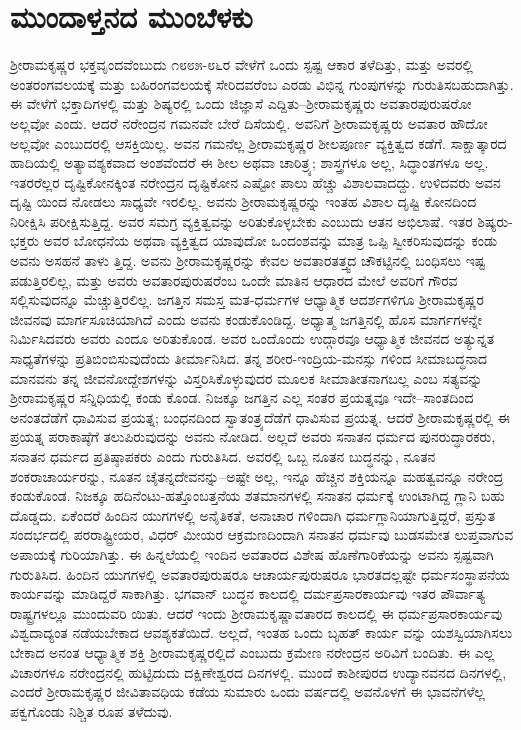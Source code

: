
\chapter{ಮುಂದಾಳ್ತನದ ಮುಂಬೆಳಕು}

\noindent

ಶ್ರೀರಾಮಕೃಷ್ಣರ ಭಕ್ತವೃಂದವೆಂಬುದು ೧೮೮೫-೮೬ರ ವೇಳೆಗೆ ಒಂದು ಸ್ಪಷ್ಟ ಆಕಾರ ತಳೆದಿತ್ತು, ಮತ್ತು ಅವರಲ್ಲಿ ಅಂತರಂಗವಲಯಕ್ಕೆ ಮತ್ತು ಬಹಿರಂಗವಲಯಕ್ಕೆ ಸೇರಿದವರೆಂಬ ಎರಡು ವಿಭಿನ್ನ ಗುಂಪುಗಳನ್ನು ಗುರುತಿಸಬಹುದಾಗಿತ್ತು. ಈ ವೇಳೆಗೆ ಭಕ್ತಾದಿಗಳಲ್ಲಿ ಮತ್ತು ಶಿಷ್ಯರಲ್ಲಿ ಒಂದು ಜಿಜ್ಞಾಸೆ ಎದ್ದಿತು–ಶ್ರೀರಾಮಕೃಷ್ಣರು ಅವತಾರಪುರುಷರೋ ಅಲ್ಲವೋ ಎಂದು. ಆದರೆ ನರೇಂದ್ರನ ಗಮನವೇ ಬೇರೆ ದಿಸೆಯಲ್ಲಿ. ಅವನಿಗೆ ಶ್ರೀರಾಮಕೃಷ್ಣರು ಅವತಾರ ಹೌದೋ ಅಲ್ಲವೋ ಎಂಬುದರಲ್ಲಿ ಆಸಕ್ತಿಯಿಲ್ಲ. ಅವನ ಗಮನೆಲ್ಲ ಶ್ರೀರಾಮಕೃಷ್ಣರ ಶೀಲಪೂರ್ಣ ವ್ಯಕ್ತಿತ್ವದ ಕಡೆಗೆ. ಸಾಕ್ಷಾತ್ಕಾರದ ಹಾದಿಯಲ್ಲಿ ಅತ್ಯಾವಶ್ಯಕವಾದ ಅಂಶವೆಂದರೆ ಈ ಶೀಲ ಅಥವಾ ಚಾರಿತ್ರ್ಯ; ಶಾಸ್ತ್ರಗಳೂ ಅಲ್ಲ, ಸಿದ್ಧಾಂತಗಳೂ ಅಲ್ಲ. ಇತರರೆಲ್ಲರ ದೃಷ್ಟಿಕೋನಕ್ಕಿಂತ ನರೇಂದ್ರನ ದೃಷ್ಟಿಕೋನ ಎಷ್ಟೋ ಪಾಲು ಹೆಚ್ಚು ವಿಶಾಲವಾದದ್ದು. ಉಳಿದವರು ಅವನ ದೃಷ್ಟಿ ಯಿಂದ ನೋಡಲು ಸಾಧ್ಯವೇ ಇರಲಿಲ್ಲ. ಅವನು ಶ್ರೀರಾಮಕೃಷ್ಣರನ್ನು ಇಂತಹ ವಿಶಾಲ ದೃಷ್ಟಿ ಕೋನದಿಂದ ನಿರೀಕ್ಷಿಸಿ ಪರೀಕ್ಷಿಸುತ್ತಿದ್ದ. ಅವರ ಸಮಗ್ರ ವ್ಯಕ್ತಿತ್ವವನ್ನು ಅರಿತುಕೊಳ್ಳಬೇಕು ಎಂಬುದು ಆತನ ಅಭಿಲಾಷೆ. ಇತರ ಶಿಷ್ಯರು-ಭಕ್ತರು ಅವರ ಬೋಧನೆಯ ಅಥವಾ ವ್ಯಕ್ತಿತ್ವದ ಯಾವುದೋ ಒಂದಂಶವನ್ನು ಮಾತ್ರ ಒಪ್ಪಿ ಸ್ವೀಕರಿಸುವುದನ್ನು ಕಂಡು ಅವನು ಅಸಹನೆ ತಾಳು ತ್ತಿದ್ದ. ಅವನು ಶ್ರೀರಾಮಕೃಷ್ಣರನ್ನು ಕೇವಲ ಅವತಾರತತ್ತ್ವದ ಚೌಕಟ್ಟಿನಲ್ಲಿ ಬಂಧಿಸಲು ಇಷ್ಟ ಪಡುತ್ತಿರಲಿಲ್ಲ, ಮತ್ತು ಅವರು ಅವತಾರಪುರುಷರೆಂಬ ಒಂದೇ ಮಾತಿನ ಆಧಾರದ ಮೇಲೆ ಅವರಿಗೆ ಗೌರವ ಸಲ್ಲಿಸುವುದನ್ನೂ ಮೆಚ್ಚುತ್ತಿರಲಿಲ್ಲ. ಜಗತ್ತಿನ ಸಮಸ್ತ ಮತ-ಧರ್ಮಗಳ ಆಧ್ಯಾತ್ಮಿಕ ಆದರ್ಶಗಳಿಗೂ ಶ್ರೀರಾಮಕೃಷ್ಣರ ಜೀವನವು ಮಾರ್ಗಸೂಚಿಯಾಗಿದೆ ಎಂದು ಅವನು ಕಂಡುಕೊಂಡಿದ್ದ. ಅಧ್ಯಾತ್ಮ ಜಗತ್ತಿನಲ್ಲಿ ಹೊಸ ಮಾರ್ಗಗಳನ್ನೇ ನಿರ್ಮಿಸಿದವರು ಅವರು ಎಂದೂ ಅರಿತುಕೊಂಡ. ಅವರ ಒಂದೊಂದು ಉದ್ಗಾರವೂ ಆಧ್ಯಾತ್ಮಿಕ ಜೀವನದ ಅತ್ಯುನ್ನತ ಸಾಧ್ಯತೆಗಳನ್ನು ಪ್ರತಿಬಿಂಬಿಸುವುದೆಂದು ತೀರ್ಮಾನಿಸಿದ. ತನ್ನ ಶರೀರ-ಇಂದ್ರಿಯ-ಮನಸ್ಸು ಗಳಿಂದ ಸೀಮಾಬದ್ಧನಾದ ಮಾನವನು ತನ್ನ ಜೀವನೋದ್ದೇಶಗಳನ್ನು ವಿಸ್ತರಿಸಿಕೊಳ್ಳುವುದರ ಮೂಲಕ ಸೀಮಾತೀತನಾಗಬಲ್ಲ ಎಂಬ ಸತ್ಯವನ್ನು ಶ್ರೀರಾಮಕೃಷ್ಣರ ಸನ್ನಿಧಿಯಲ್ಲಿ ಕಂಡು ಕೊಂಡ. ನಿಜಕ್ಕೂ ಜಗತ್ತಿನ ಎಲ್ಲ ಸಂತರ ಪ್ರಯತ್ನವೂ ಇದೇ–ಸಾಂತದಿಂದ ಅನಂತದೆಡೆಗೆ ಧಾವಿಸುವ ಪ್ರಯತ್ನ; ಬಂಧನದಿಂದ ಸ್ವಾತಂತ್ರ್ಯದೆಡೆಗೆ ಧಾವಿಸುವ ಪ್ರಯತ್ನ. ಆದರೆ ಶ್ರೀರಾಮಕೃಷ್ಣರಲ್ಲಿ ಈ ಪ್ರಯತ್ನ ಪರಾಕಾಷ್ಠೆಗೆ ತಲುಪಿರುವುದನ್ನು ಅವನು ನೋಡಿದ. ಅಲ್ಲದೆ ಅವರು ಸನಾತನ ಧರ್ಮದ ಪುನರುದ್ಧಾರಕರು, ಸನಾತನ ಧರ್ಮದ ಪ್ರತಿಷ್ಠಾಪಕರು ಎಂದು ಗುರುತಿಸಿದ. ಅವರಲ್ಲಿ ಒಬ್ಬ ನೂತನ ಬುದ್ಧನನ್ನು, ನೂತನ ಶಂಕರಾಚಾರ್ಯರನ್ನು, ನೂತನ ಚೈತನ್ನದೇವನನ್ನು–ಅಷ್ಟೇ ಅಲ್ಲ, ಇನ್ನೂ ಹೆಚ್ಚಿನ ಶಕ್ತಿಯನ್ನೂ ಮಹತ್ವವನ್ನೂ ನರೇಂದ್ರ ಕಂಡುಕೊಂಡ. ನಿಜಕ್ಕೂ ಹದಿನೆಂಟು-ಹತ್ತೊಂಬತ್ತನೆಯ ಶತಮಾನಗಳಲ್ಲಿ ಸನಾತನ ಧರ್ಮಕ್ಕೆ ಉಂಟಾಗಿದ್ದ ಗ್ಲಾನಿ ಬಹು ದೊಡ್ಡದು. ಏಕೆಂದರೆ ಹಿಂದಿನ ಯುಗಗಳಲ್ಲಿ ಅನೈತಿಕತೆ, ಅನಾಚಾರ ಗಳಿಂದಾಗಿ ಧರ್ಮಗ್ಲಾನಿಯಾಗುತ್ತಿದ್ದರೆ, ಪ್ರಸ್ತುತ ಸಂದರ್ಭದಲ್ಲಿ ಪರರಾಷ್ಟ್ರೀಯರ, ವಿಧರ್ ಮೀಯರ ಆಕ್ರಮಣದಿಂದಾಗಿ ಸನಾತನ ಧರ್ಮವು ಬುಡಸಮೇತ ಲುಪ್ತವಾಗುವ ಅಪಾಯಕ್ಕೆ ಗುರಿಯಾಗಿತ್ತು. ಈ ಹಿನ್ನಲೆಯಲ್ಲಿ ಇಂದಿನ ಅವತಾರದ ವಿಶೇಷ ಹೊಣೆಗಾರಿಕೆಯನ್ನು ಅವನು ಸ್ಪಷ್ಟವಾಗಿ ಗುರುತಿಸಿದ. ಹಿಂದಿನ ಯುಗಗಳಲ್ಲಿ ಅವತಾರಪುರುಷರೂ ಆಚಾರ್ಯಪುರುಷರೂ ಭಾರತದಲ್ಲಷ್ಟೇ ಧರ್ಮಸಂಸ್ಥಾಪನೆಯ ಕಾರ್ಯವನ್ನು ಮಾಡಿದ್ದರೆ ಸಾಕಾಗಿತ್ತು. ಭಗವಾನ್ ಬುದ್ಧನ ಕಾಲದಲ್ಲಿ ದರ್ಮಪ್ರಸಾರಕಾರ್ಯವು ಇತರ ಪೌರ್ವಾತ್ಯ ರಾಷ್ಟ್ರಗಳಲ್ಲೂ ಮುಂದುವರಿ ಯಿತು. ಆದರೆ ಇಂದು ಶ್ರೀರಾಮಕೃಷ್ಣಾವತಾರದ ಕಾಲದಲ್ಲಿ ಈ ಧರ್ಮಪ್ರಸಾರಕಾರ್ಯವು ವಿಶ್ವದಾದ್ಯಂತ ನಡೆಯಬೇಕಾದ ಆವಶ್ಯಕತೆಯಿದೆ. ಅಲ್ಲದೆ, ಇಂತಹ ಒಂದು ಬೃಹತ್ ಕಾರ್ಯ ವನ್ನು ಯಶಸ್ವಿಯಾಗಿಸಲು ಬೇಕಾದ ಅನಂತ ಆಧ್ಯಾತ್ಮಿಕ ಶಕ್ತಿ ಶ್ರೀರಾಮಕೃಷ್ಣರಲ್ಲಿದೆ ಎಂಬುದು ಕ್ರಮೇಣ ನರೇಂದ್ರನ ಅರಿವಿಗೆ ಬಂದಿತು. ಈ ಎಲ್ಲ ವಿಚಾರಗಳೂ ನರೇಂದ್ರನಲ್ಲಿ ಹುಟ್ಟಿದುದು ದಕ್ಷಿಣೇಶ್ವರದ ದಿನಗಳಲ್ಲಿ. ಮುಂದೆ ಕಾಶೀಪುರದ ಉದ್ಯಾನವನದ ದಿನಗಳಲ್ಲಿ, ಎಂದರೆ ಶ್ರೀರಾಮಕೃಷ್ಣರ ಜೀವಿತಾವಧಿಯ ಕಡೆಯ ಸುಮಾರು ಒಂದು ವರ್ಷದಲ್ಲಿ ಅವನೊಳಗೆ ಈ ಭಾವನೆಗಳೆಲ್ಲ ಪಕ್ವಗೊಂಡು ನಿಶ್ಚಿತ ರೂಪ ತಳೆದುವು.

